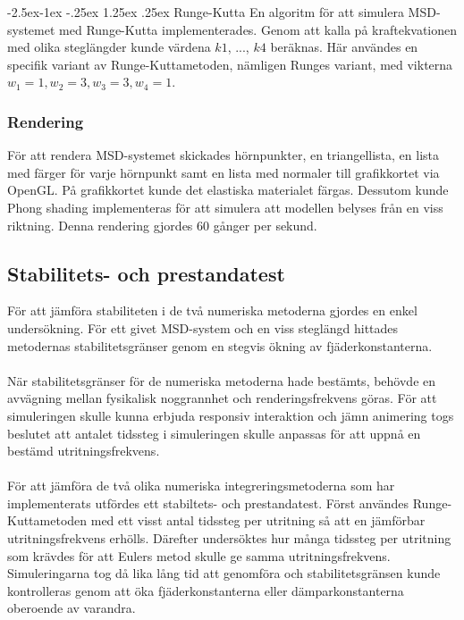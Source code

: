\documentclass[a4paper,12pt,oneside,final,swedish]{extarticle}
\makeatletter
\renewcommand\paragraph{\@startsection{paragraph}{4}{\z@}%
            {-2.5ex\@plus -1ex \@minus -.25ex}%
            {1.25ex \@plus .25ex}%
            {\normalfont\normalsize\bfseries}}
\makeatother
\begin{document}
\paragraph{Runge-Kutta}
En algoritm för att simulera MSD-systemet med Runge-Kutta implementerades. Genom att kalla på kraftekvationen med olika steglängder kunde värdena $k1$, ..., $k4$ beräknas. Här användes en specifik variant av Runge-Kuttametoden, nämligen Runges variant, med vikterna \begin{math} w_1 = 1, w_2 = 3, w_3 = 3, w_4 = 1 \end{math}.
\subsubsection{Rendering}
För att rendera MSD-systemet skickades hörnpunkter, en triangellista, en lista med färger för varje hörnpunkt samt en lista med normaler till grafikkortet via OpenGL. På grafikkortet kunde det elastiska materialet färgas. Dessutom kunde Phong shading implementeras för att simulera att modellen belyses från en viss riktning. Denna rendering gjordes 60 gånger per sekund.
\subsection{Stabilitets- och prestandatest}
För att jämföra stabiliteten i de två numeriska metoderna gjordes en enkel undersökning. För ett givet MSD-system och en viss steglängd hittades metodernas stabilitetsgränser genom en stegvis ökning av fjäderkonstanterna.
\\\\När stabilitetsgränser för de numeriska metoderna hade bestämts, behövde en avvägning mellan fysikalisk noggrannhet och renderingsfrekvens göras. För att simuleringen skulle kunna erbjuda responsiv interaktion och jämn animering togs beslutet att antalet tidssteg i simuleringen skulle anpassas för att uppnå en bestämd utritningsfrekvens.
\\\\För att jämföra de två olika numeriska integreringsmetoderna som har implementerats utfördes ett stabiltets- och prestandatest. Först användes Runge-Kuttametoden med ett visst antal tidssteg per utritning så att en jämförbar utritningsfrekvens erhölls. Därefter undersöktes hur många tidssteg per utritning som krävdes för att Eulers metod skulle ge samma utritningsfrekvens. Simuleringarna tog då lika lång tid att genomföra och stabilitetsgränsen kunde kontrolleras genom att öka fjäderkonstanterna eller dämparkonstanterna oberoende av varandra.
\end{document}
